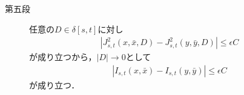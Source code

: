 \begin{prf}
\begin{description}
			\item[第五段]
				任意の$D \in \delta[s,t]$に対し
				\begin{align}
					\left| J^2_{s,t}(x,\bar{x},D) - J^2_{s,t}(y,\bar{y},D) \right| \leq \epsilon C
				\end{align}
				が成り立つから，$|D| \longrightarrow 0$として
				\begin{align}
					\left| I_{s,t}(x,\bar{x}) - I_{s,t}(y,\bar{y}) \right| \leq \epsilon C
				\end{align}
				が成り立つ．
				\QED
		\end{description}
	\end{prf}
	
	\begin{screen}
		
	\end{screen}
	
